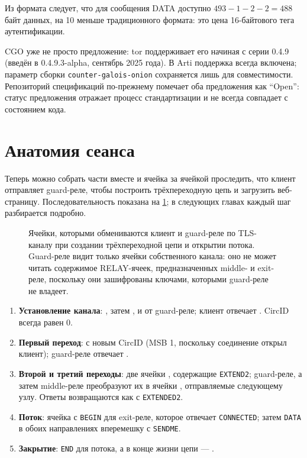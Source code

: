\begin{approfondimento}
Из формата следует, что для сообщения DATA доступно $493 - 1 - 2 - 2 = 488$ байт данных, на 10 меньше традиционного формата: это цена 16-байтового тега аутентификации.
\end{approfondimento}

CGO уже не просто предложение: tor поддерживает его начиная с серии 0.4.9 (введён в 0.4.9.3-alpha, сентябрь 2025 года). В Arti поддержка всегда включена; параметр сборки \texttt{counter-galois-onion} сохраняется лишь для совместимости. Репозиторий спецификаций по-прежнему помечает оба предложения как \enquote{Open}: статус предложения отражает процесс стандартизации и не всегда совпадает с состоянием кода.

\section{Анатомия сеанса}\label{sec:sessione}

Теперь можно собрать части вместе и ячейка за ячейкой проследить, что клиент отправляет guard-реле, чтобы построить трёхпереходную цепь и загрузить веб-страницу. Последовательность показана на \cref{fig:sessione}; в следующих главах каждый шаг разбирается подробно.

\begin{figure}[htbp]
\centering

\caption{Ячейки, которыми обмениваются клиент и guard-реле по TLS-каналу при создании трёхпереходной цепи и открытии потока. Guard-реле видит только ячейки собственного канала: оно не может читать содержимое RELAY-ячеек, предназначенных middle- и exit-реле, поскольку они зашифрованы ключами, которыми guard-реле не владеет.}
\label{fig:sessione}
\end{figure}

\begin{enumerate}
  \item \textbf{Установление канала}: , затем ,  и  от guard-реле; клиент отвечает . CircID всегда равен 0.
  \item \textbf{Первый переход}:  с новым CircID (MSB 1, поскольку соединение открыл клиент); guard-реле отвечает .
  \item \textbf{Второй и третий переходы}: две ячейки , содержащие \texttt{EXTEND2}; guard-реле, а затем middle-реле преобразуют их в ячейки , отправляемые следующему узлу. Ответы возвращаются как  с \texttt{EXTENDED2}.
  \item \textbf{Поток}: ячейка с \texttt{BEGIN} для exit-реле, которое отвечает \texttt{CONNECTED}; затем \texttt{DATA} в обоих направлениях вперемешку с \texttt{SENDME}.
  \item \textbf{Закрытие}: \texttt{END} для потока, а в конце жизни цепи --- .
\end{enumerate}

